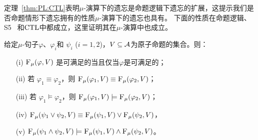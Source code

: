 定理~\ref{thm:PL:CTL}表明$\mu$-演算下的遗忘是命题逻辑下遗忘的扩展，这提示我们是否命题情形下遗忘拥有的性质$\mu$-演算下的遗忘也具有。
下面的性质在命题逻辑、S5~\cite{Yan:AIJ:2009} 和$\textrm{CTL}$中都成立，这里证明其在$\mu$-演算中也成立。
\begin{proposition}
	\label{chapter06:pro:ctl:forget:1}
	给定$\mu$-句子$\varphi$、$\varphi_i$和 $\psi_i$ ($i=1,2$)，$V\subseteq {\cal A}$为原子命题的集合。则：
	\begin{itemize}
		\item[(i)] ${\textsc{F}_{\textsc{$\mu$}}}(\varphi, V)$ 是可满足的当且仅当$\varphi$是可满足的；
		\item[(ii)] 若 $\varphi_1 \equiv \varphi_2$，则 ${\textsc{F}_{\textsc{$\mu$}}}(\varphi_1, V) \equiv {\textsc{F}_{\textsc{$\mu$}}}(\varphi_2, V)$；
		\item[(iii)] 若 $\varphi_1 \models \varphi_2$，则 ${\textsc{F}_{\textsc{$\mu$}}}(\varphi_1, V) \models {\textsc{F}_{\textsc{$\mu$}}}(\varphi_2, V)$；
		\item[(iv)] ${\textsc{F}_{\textsc{$\mu$}}}(\psi_1 \vee \psi_2, V) \equiv {\textsc{F}_{\textsc{$\mu$}}}(\psi_1, V) \vee {\textsc{F}_{\textsc{$\mu$}}}(\psi_2, V)$，
		\item[(v)] ${\textsc{F}_{\textsc{$\mu$}}}(\psi_1 \wedge \psi_2, V) \models {\textsc{F}_{\textsc{$\mu$}}}(\psi_1, V) \wedge {\textsc{F}_{\textsc{$\mu$}}}(\psi_2, V)$。
	\end{itemize}
\end{proposition}
